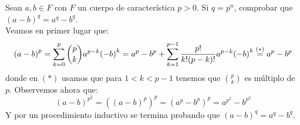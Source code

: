 \begin{ejercicio}\label{ej:cuerpo_caracteristica}
    Sean $a,b\in F$ con $F$ un cuerpo de característica $p>0$. Si $q=p^n$, comprobar que ${(a-b)}^{q} = a^q - b^q$.\\

    \noindent
    Veamos en primer lugar que:
    \begin{equation*}
        {(a-b)}^{p} = \sum_{k=0}^{p} \binom{p}{k} a^{p-k}{(-b)}^k = a^p - b^p + \sum_{k=1}^{p-1} \dfrac{p!}{k!(p-k)!}a^{p-k}{(-b)}^{k} \stackrel{(\ast)}{=} a^p - b^p
    \end{equation*}
    donde en $(\ast)$ usamos que para $1<k<p-1$ tenemos que $\binom{p}{k}$ es múltiplo de $p$. Observemos ahora que:
    \begin{equation*}
        {(a-b)}^{p^2} = {({(a-b)}^{p})}^{p} = {(a^p-b^p)}^{p} = a^{p^2} - b^{p^2}
    \end{equation*}
    Y por un procedimiento inductivo se termina probando que ${(a-b)}^{q} = a^q - b^q$.
\end{ejercicio}

